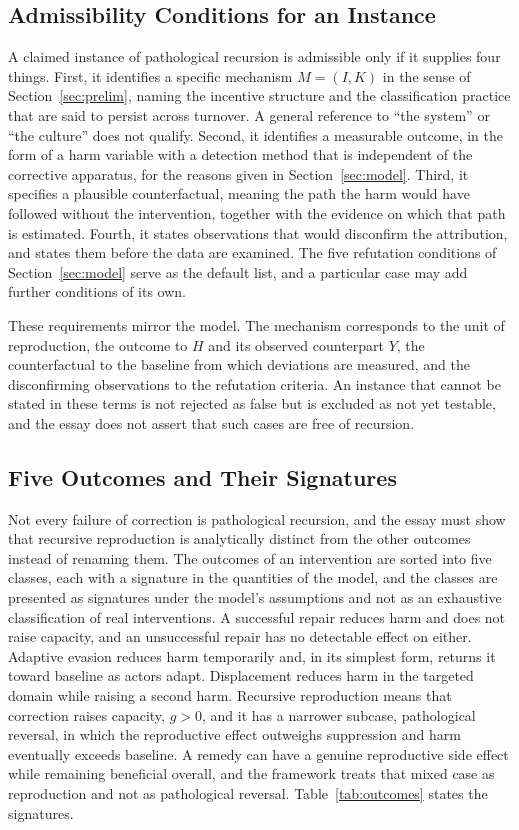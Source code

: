 \documentclass[12pt]{article}
\theoremstyle{remark}
\begin{document}
\subsection{Admissibility Conditions for an Instance}

A claimed instance of pathological recursion is admissible only if it supplies four things. First, it identifies a specific mechanism $M = (I, K)$ in the sense of Section~\ref{sec:prelim}, naming the incentive structure and the classification practice that are said to persist across turnover. A general reference to ``the system'' or ``the culture'' does not qualify. Second, it identifies a measurable outcome, in the form of a harm variable with a detection method that is independent of the corrective apparatus, for the reasons given in Section~\ref{sec:model}. Third, it specifies a plausible counterfactual, meaning the path the harm would have followed without the intervention, together with the evidence on which that path is estimated. Fourth, it states observations that would disconfirm the attribution, and states them before the data are examined. The five refutation conditions of Section~\ref{sec:model} serve as the default list, and a particular case may add further conditions of its own.

These requirements mirror the model. The mechanism corresponds to the unit of reproduction, the outcome to $H$ and its observed counterpart $Y$, the counterfactual to the baseline from which deviations are measured, and the disconfirming observations to the refutation criteria. An instance that cannot be stated in these terms is not rejected as false but is excluded as not yet testable, and the essay does not assert that such cases are free of recursion.

\subsection{Five Outcomes and Their Signatures}

Not every failure of correction is pathological recursion, and the essay must show that recursive reproduction is analytically distinct from the other outcomes instead of renaming them. The outcomes of an intervention are sorted into five classes, each with a signature in the quantities of the model, and the classes are presented as signatures under the model's assumptions and not as an exhaustive classification of real interventions. A successful repair reduces harm and does not raise capacity, and an unsuccessful repair has no detectable effect on either. Adaptive evasion reduces harm temporarily and, in its simplest form, returns it toward baseline as actors adapt. Displacement reduces harm in the targeted domain while raising a second harm. Recursive reproduction means that correction raises capacity, $g > 0$, and it has a narrower subcase, pathological reversal, in which the reproductive effect outweighs suppression and harm eventually exceeds baseline. A remedy can have a genuine reproductive side effect while remaining beneficial overall, and the framework treats that mixed case as reproduction and not as pathological reversal. Table~\ref{tab:outcomes} states the signatures.
\end{document}
